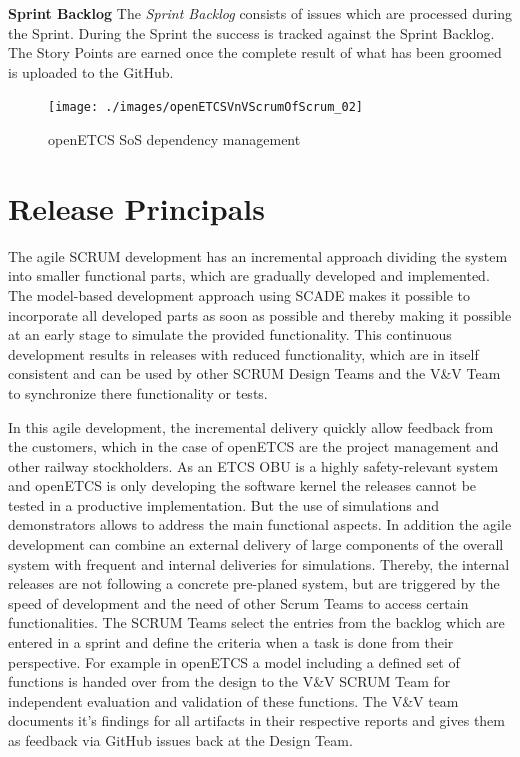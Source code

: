 \textbf{Sprint Backlog}
The \textit{Sprint Backlog} consists of issues which are processed during the Sprint.
During the Sprint the success is tracked against the Sprint Backlog.
The Story Points are earned once the complete result of what has been groomed is uploaded to the GitHub.

\begin{figure}[h]
	\centering
	\texttt{[image: ./images/openETCSVnVScrumOfScrum\_02]}
	\caption{openETCS SoS dependency management}
	\label{fig:openETCSVnVScrumOfScrum}
\end{figure}

\chapter{Release Principals}
\label{sec:Releases}

The agile SCRUM development has an incremental approach dividing the system into smaller functional parts, which are gradually developed and implemented. The model-based development approach using SCADE makes it possible to incorporate all developed parts as soon as possible and thereby making it possible at an early stage to simulate the provided functionality. This continuous development results in releases with reduced functionality, which are in itself consistent and can be used by other SCRUM Design Teams and the V\&V Team to synchronize there functionality or tests.

In this agile development, the incremental delivery quickly allow feedback from the customers, which in the case of openETCS are the project management and other railway stockholders. As an ETCS OBU is a highly safety-relevant system and openETCS is only developing the software kernel the releases cannot be tested in a productive implementation. But the use of simulations and demonstrators allows to address the main functional aspects. In addition the agile development can combine an external delivery of large components of the overall system with frequent and internal deliveries for simulations. Thereby, the internal releases are not following a concrete pre-planed system, but are triggered by the speed of development and the need of other Scrum Teams to access certain functionalities. The SCRUM Teams select the entries from the backlog which are entered in a sprint and define the criteria when a task is done from their perspective. For example in openETCS a model including a defined set of functions is handed over from the design to the V\&V SCRUM Team for independent evaluation and validation of these functions. The V\&V team documents it's findings for all artifacts in their respective reports and gives them as feedback via GitHub issues back at the Design Team.  

